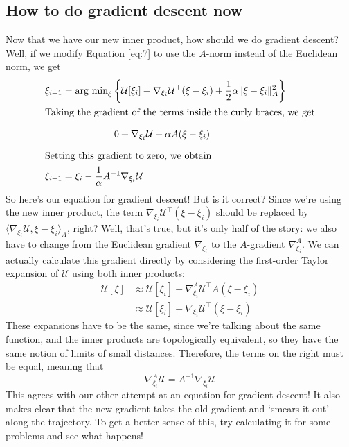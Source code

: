 \documentclass[twoside]{article}
\newcommand{\cu}{\mathcal{U}}
\begin{document}
\subsection{How to do gradient descent now}
\label{sec:how-do-gradient}

Now that we have our new inner product, how should we do gradient descent? Well, if we modify Equation \eqref{eq:7} to use the $A$-norm instead of the Euclidean norm, we get
\begin{align}
  \label{eq:8}
  \xi_{i+1} &= \text{arg min}_\xi \left\{ \cu[\xi_i] + \nabla_{\xi_i}\cu^\top(\xi - \xi_i) + \frac{1}{2}\alpha \| \xi - \xi_i \|_A^2 \right\}\\
  \intertext{Taking the gradient of the terms inside the curly braces, we get}
            &\phantom{- \text{arg min}_\xi \bigg\{  }0 + \nabla_{\xi_i}\cu + \alpha A (\xi - \xi_i) \label{eq:17} \\
  \intertext{Setting this gradient to zero, we obtain}
  \xi_{i + 1} &= \xi_i - \frac{1}{\alpha} A^{-1}\nabla_{\xi_i}\cu
\end{align}
So here's our equation for gradient descent! But is it correct? Since we're using the new inner product, the term $\nabla_{\xi_i}\cu^\top(\xi - \xi_i)$ should be replaced by $\langle \nabla_{\xi_i}\cu, \xi - \xi_i \rangle_A$, right? Well, that's true, but it's only half of the story: we also have to change from the Euclidean gradient $\nabla_{\xi_i}$ to the $A$-gradient $\nabla^A_{\xi_i}$. We can actually calculate this gradient directly by considering the first-order Taylor expansion of $\cu$ using both inner products:
\begin{align}
  \label{eq:18}
  \cu[\xi] &\approx \cu[\xi_i] + \nabla^A_{\xi_i}\cu^\top A (\xi - \xi_i) \\
\label{eq:19}  &\approx \cu[\xi_i] + \nabla_{\xi_i} \cu^\top (\xi - \xi_i)
\end{align}
These expansions have to be the same, since we're talking about the same function, and the inner products are topologically equivalent, so they have the same notion of limits of small distances. Therefore, the terms on the right must be equal, meaning that
\begin{equation}
  \label{eq:20}
  \nabla_{\xi_i}^A \cu = A^{-1} \nabla_{\xi_i}\cu
\end{equation}
This agrees with our other attempt at an equation for gradient descent! It also makes clear that the new gradient takes the old gradient and `smears it out' along the trajectory. To get a better sense of this, try calculating it for some problems and see what happens!
\end{document}
